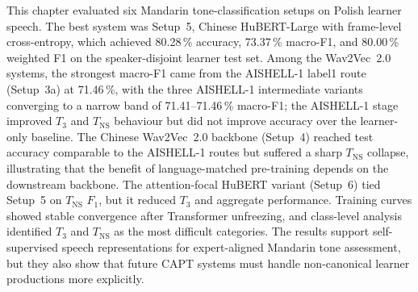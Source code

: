 This chapter evaluated six Mandarin tone-classification setups on Polish
learner speech. The best system was Setup~5, Chinese HuBERT-Large with
frame-level cross-entropy, which achieved 80.28\,\% accuracy, 73.37\,\%
macro-F1, and 80.00\,\% weighted F1 on the speaker-disjoint learner test set.
Among the Wav2Vec~2.0 systems, the strongest macro-F1 came from the AISHELL-1
label1 route (Setup~3a) at 71.46\,\%, with the three AISHELL-1 intermediate
variants converging to a narrow band of 71.41--71.46\,\% macro-F1; the
AISHELL-1 stage improved \(T_3\) and \(T_{\mathrm{NS}}\) behaviour but did not
improve accuracy over the learner-only baseline. The Chinese Wav2Vec~2.0
backbone (Setup~4) reached test accuracy comparable to the AISHELL-1 routes
but suffered a sharp \(T_{\mathrm{NS}}\) collapse, illustrating that the
benefit of language-matched pre-training depends on the downstream backbone.
The attention-focal HuBERT variant (Setup~6) tied Setup~5 on
\(T_{\mathrm{NS}}\) \(F_1\), but it reduced \(T_3\) and aggregate performance.
Training curves
showed stable convergence after Transformer unfreezing, and class-level
analysis identified \(T_3\) and \(T_{\mathrm{NS}}\) as the most difficult
categories. The results support self-supervised speech representations for
expert-aligned Mandarin tone assessment, but they also show that future CAPT
systems must handle non-canonical learner productions more explicitly.
